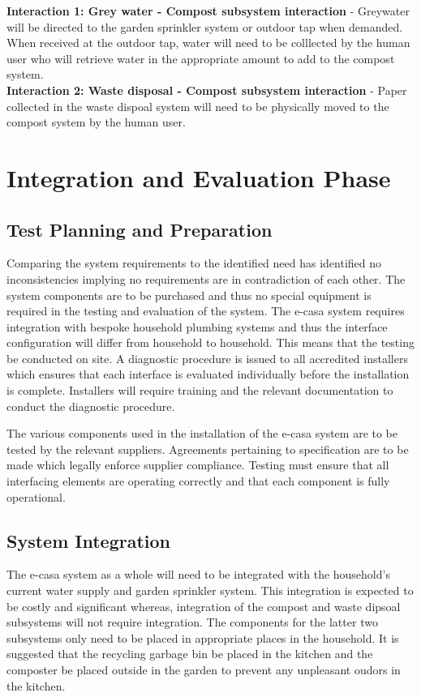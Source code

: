 \documentclass[a4paper,11pt,fleqn]{report}
\begin{document}
\textbf{Interaction 1: Grey water - Compost subsystem interaction} - Greywater will be directed to the garden sprinkler system or outdoor tap when demanded. When received at the outdoor tap, water will need to be colllected by the human user who will retrieve water in the appropriate amount to add to the compost system.\\

\textbf{Interaction 2: Waste disposal - Compost subsystem interaction} - Paper collected in the waste dispoal system will need to be physically moved to the compost system by the human user.

\section{Integration and Evaluation Phase}

\subsection{Test Planning and Preparation}
Comparing the system requirements to the identified need has identified no inconsistencies implying no requirements are in contradiction of each other. The system components are to be purchased and thus no special equipment is required in the testing and evaluation of the system. The e-casa system requires integration with bespoke household plumbing systems and thus the interface configuration will differ from household to household. This means that the testing be conducted on site. A diagnostic procedure is issued to all accredited installers which ensures that each interface is evaluated individually before the installation is complete. Installers will require training and the relevant documentation to conduct the diagnostic procedure.
					
The various components used in the installation of the e-casa system are to be tested by the relevant suppliers. Agreements pertaining to specification are to be made which legally enforce supplier compliance. Testing must ensure that all interfacing elements are operating correctly and that each component is fully operational.


\subsection{System Integration}
The \ac{e-casa} system as a whole will need to be integrated with the household's current water supply and garden sprinkler system. This integration is expected to be costly and significant whereas, integration of the compost and waste dipsoal subsystems will not require integration. The components for the latter two subsystems only need to be placed in appropriate places in the household. It is suggested that the recycling garbage bin be placed in the kitchen and the composter be placed outside in the garden to prevent any unpleasant oudors in the kitchen.
\end{document}
